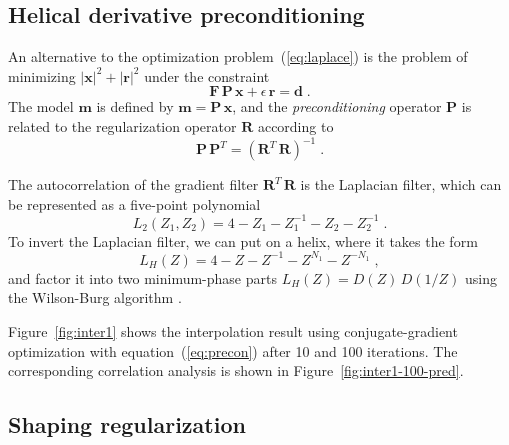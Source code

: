 
\subsection{Helical derivative preconditioning}

An alternative to the optimization problem~(\ref{eq:laplace}) is the
problem of minimizing $|\mathbf{x}|^2+|\mathbf{r}|^2$ under the
constraint 
\begin{equation}
\label{eq:precon}
\mathbf{F}\,\mathbf{P}\,\mathbf{x} + \epsilon\,\mathbf{r} = \mathbf{d}\;.
\end{equation}
The model $\mathbf{m}$ is defined by
$\mathbf{m}=\mathbf{P}\,\mathbf{x}$, and the \emph{preconditioning}
operator $\mathbf{P}$ is related to the regularization operator
$\mathbf{R}$ according to
\begin{equation}
\label{eq:covar}
\mathbf{P}\,\mathbf{P}^T = \left(\mathbf{R}^T\,\mathbf{R}\right)^{-1}\;.        
\end{equation}

The autocorrelation of the gradient filter $\mathbf{R}^T\,\mathbf{R}$
is the Laplacian filter, which can be represented as a five-point polynomial
\begin{equation}
\label{eq:lap2}
L_2(Z_1,Z_2) = 4 - Z_1 - Z_1^{-1} - Z_2 - Z_2^{-1}\;.
\end{equation} 
To invert the Laplacian filter, we can put on a helix, where it takes
the form
\begin{equation}
\label{eq:lap1}
L_H(Z) = 4 - Z - Z^{-1} - Z^{N_1} - Z^{-N_1}\;,
\end{equation} 
and factor it into two minimum-phase parts $L_H(Z) = D(Z)\,D(1/Z)$
using the Wilson-Burg algorithm \cite[]{burg}. 


Figure~\ref{fig:inter1} shows the interpolation result using
conjugate-gradient optimization with equation~(\ref{eq:precon}) after
10 and 100 iterations. The corresponding correlation analysis is shown
in Figure~\ref{fig:inter1-100-pred}.


\subsection{Shaping regularization}

